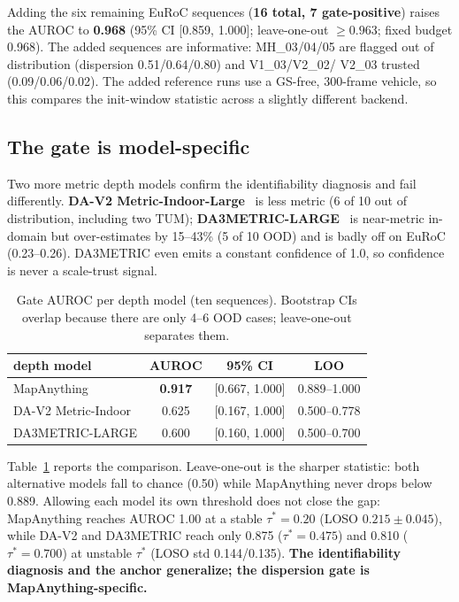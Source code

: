 Adding the six remaining EuRoC sequences (\textbf{16 total, 7 gate-positive})
raises the AUROC to \textbf{0.968} (95\% CI [0.859, 1.000]; leave-one-out
$\ge0.963$; fixed budget 0.968). The added sequences are informative: MH\_03/04/05
are flagged out of distribution (dispersion 0.51/0.64/0.80) and V1\_03/V2\_02/
V2\_03 trusted (0.09/0.06/0.02). The added reference runs use a GS-free,
300-frame vehicle, so this compares the init-window statistic across a slightly
different backend.

\subsection{The gate is model-specific}
\label{sec:model}

Two more metric depth models confirm the identifiability diagnosis and fail
differently. \textbf{DA-V2 Metric-Indoor-Large}~\cite{depthanythingv2} is less
metric (6 of 10 out of distribution, including two TUM);
\textbf{DA3METRIC-LARGE}~\cite{da3} is near-metric in-domain but over-estimates
by 15--43\% (5 of 10 OOD) and is badly off on EuRoC (0.23--0.26). DA3METRIC even
emits a constant confidence of 1.0, so confidence is never a scale-trust signal.

\begin{table}[t]
\centering
\caption{Gate AUROC per depth model (ten sequences). Bootstrap CIs overlap
because there are only 4--6 OOD cases; leave-one-out separates them.}
\label{tab:models}
\footnotesize
\setlength{\tabcolsep}{4pt}
\begin{tabular}{@{}lccc@{}}
\toprule
depth model & AUROC & 95\% CI & LOO \\
\midrule
MapAnything & \textbf{0.917} & [0.667, 1.000] & 0.889--1.000 \\
DA-V2 Metric-Indoor & 0.625 & [0.167, 1.000] & 0.500--0.778 \\
DA3METRIC-LARGE & 0.600 & [0.160, 1.000] & 0.500--0.700 \\
\bottomrule
\end{tabular}
\end{table}

\noindent Table~\ref{tab:models} reports the comparison. Leave-one-out is the sharper statistic: both alternative models fall
to chance (0.50) while MapAnything never drops below 0.889. Allowing each model
its own threshold does not close the gap: MapAnything reaches AUROC 1.00 at a
stable $\tau^\ast=0.20$ (LOSO $0.215\pm0.045$), while DA-V2 and DA3METRIC reach
only 0.875 ($\tau^\ast=0.475$) and 0.810 ($\tau^\ast=0.700$) at unstable
$\tau^\ast$ (LOSO std 0.144/0.135). \textbf{The identifiability diagnosis and the
anchor generalize; the dispersion gate is MapAnything-specific.}

